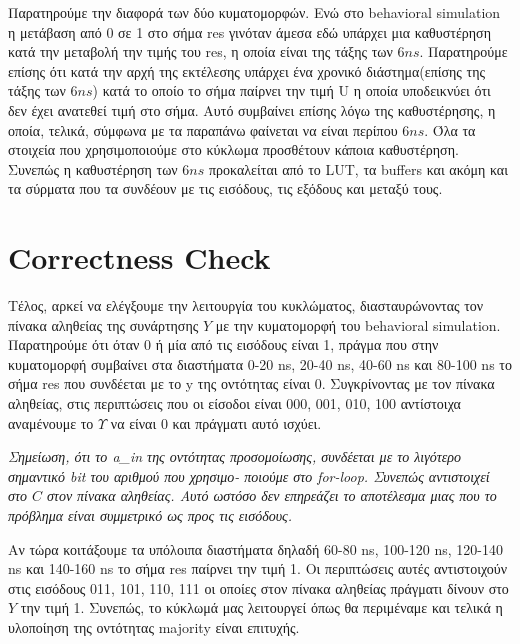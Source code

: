 \documentclass[]{article}
\begin{document}
Παρατηρούμε την διαφορά των δύο κυματομορφών. Ενώ στο behavioral simulation η μετάβαση από 0 σε 1 στο σήμα res γινόταν άμεσα εδώ
υπάρχει μια καθυστέρηση κατά την μεταβολή την τιμής του res, η οποία είναι της τάξης των $6ns$. Παρατηρούμε επίσης ότι κατά την αρχή
της εκτέλεσης υπάρχει ένα χρονικό διάστημα(επίσης της τάξης των $6ns$) κατά το οποίο το σήμα παίρνει την τιμή U η οποία υποδεικνύει ότι δεν έχει ανατεθεί τιμή στο σήμα.
Αυτό συμβαίνει επίσης λόγω της καθυστέρησης, η οποία, τελικά, σύμφωνα με τα παραπάνω φαίνεται να είναι περίπου $6ns$.
Όλα τα στοιχεία που χρησιμοποιούμε στο κύκλωμα προσθέτουν κάποια καθυστέρηση. Συνεπώς η καθυστέρηση των $6ns$ προκαλείται από το LUT, τα buffers και ακόμη και τα σύρματα που τα συνδέουν με τις εισόδους, τις εξόδους και μεταξύ τους.

\section{Correctness Check}
Τέλος, αρκεί να ελέγξουμε την λειτουργία του κυκλώματος, διασταυρώνοντας τον πίνακα αληθείας της συνάρτησης $Y$ με την κυματομορφή του behavioral simulation.
Παρατηρούμε ότι όταν 0 ή μία από τις εισόδους είναι 1, πράγμα που στην κυματομορφή συμβαίνει στα διαστήματα 0-20 ns, 20-40 ns, 40-60 ns και 80-100 ns το σήμα res που συνδέεται με το y της οντότητας είναι 0.
Συγκρίνοντας με τον πίνακα αληθείας, στις περιπτώσεις που οι είσοδοι είναι 000, 001, 010, 100 αντίστοιχα αναμένουμε το $Υ$ να είναι 0 και πράγματι αυτό ισχύει.

\textit{Σημείωση, ότι το a\_in της οντότητας προσομοίωσης, συνδέεται με το λιγότερο σημαντικό bit του αριθμού που χρησιμο- ποιούμε στο for-loop.
	Συνεπώς αντιστοιχεί στο $C$ στον πίνακα αληθείας. Αυτό ωστόσο δεν επηρεάζει το αποτέλεσμα μιας που το πρόβλημα είναι συμμετρικό ως προς τις εισόδους.}

Αν τώρα κοιτάξουμε τα υπόλοιπα διαστήματα δηλαδή 60-80 ns, 100-120 ns, 120-140 ns και 140-160 ns το σήμα res παίρνει την τιμή 1.
Οι περιπτώσεις αυτές αντιστοιχούν στις εισόδους 011, 101, 110, 111 οι οποίες στον πίνακα αληθείας πράγματι δίνουν στο $Y$ την τιμή 1.
Συνεπώς, το κύκλωμά μας λειτουργεί όπως θα περιμέναμε και τελικά η υλοποίηση της οντότητας majority είναι επιτυχής.
\end{document}
